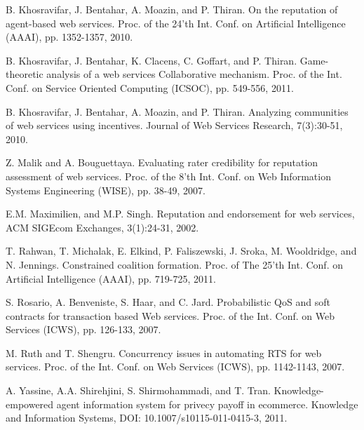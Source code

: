 \documentclass[fleqn]{singlecol-new}
\begin{document}
\begin{thebibliography}{1}
B. Khosravifar, J. Bentahar, A. Moazin, and P. Thiran. On the
reputation of agent-based web services. Proc. of the 24'th Int.
Conf. on Artificial Intelligence (AAAI), pp. 1352-1357, 2010.


B. Khosravifar, J. Bentahar, K. Clacens, C. Goffart, and P.
Thiran. Game-theoretic analysis of a web services Collaborative
mechanism. Proc. of the Int. Conf. on Service Oriented Computing
(ICSOC), pp. 549-556, 2011.


B. Khosravifar, J. Bentahar, A. Moazin, and P. Thiran. Analyzing
communities of web services using incentives. Journal of Web
Services Research, 7(3):30-51, 2010.


Z. Malik and A. Bouguettaya. Evaluating rater credibility for
reputation assessment of web services. Proc. of the 8'th Int.
Conf. on Web Information Systems Engineering (WISE), pp. 38-49,
2007.


E.M. Maximilien, and M.P. Singh. Reputation and endorsement for
web services, ACM SIGEcom Exchanges, 3(1):24-31, 2002.

T. Rahwan, T. Michalak, E. Elkind, P. Faliszewski, J. Sroka, M.
Wooldridge, and N. Jennings. Constrained coalition formation.
Proc. of The 25'th Int. Conf. on Artificial Intelligence (AAAI),
pp. 719-725, 2011.

S. Rosario, A. Benveniste, S. Haar, and C. Jard. Probabilistic QoS
and soft contracts for transaction based Web services. Proc. of
the Int. Conf. on Web Services (ICWS), pp. 126-133, 2007.

M. Ruth and  T. Shengru. Concurrency issues in automating RTS for
web services. Proc. of the Int. Conf. on Web Services (ICWS), pp.
1142-1143, 2007.


A. Yassine, A.A. Shirehjini, S. Shirmohammadi, and T. Tran.
Knowledge-empowered agent information system for privecy payoff in
ecommerce. Knowledge and Information Systems, DOI:
10.1007/s10115-011-0415-3, 2011.

\end{thebibliography}


\end{document}
